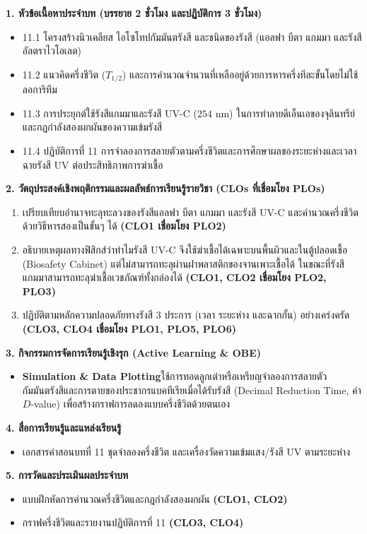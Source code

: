 \cleardoublepage
{}
\begin{planbox}
\noindent\textbf{1. หัวข้อเนื้อหาประจำบท (บรรยาย 2 ชั่วโมง และปฏิบัติการ 3 ชั่วโมง)}
\begin{itemize}
    \item 11.1 โครงสร้างนิวเคลียส ไอโซโทปกัมมันตรังสี และชนิดของรังสี (แอลฟา บีตา แกมมา และรังสีอัลตราไวโอเลต)
    \item 11.2 แนวคิดครึ่งชีวิต ($T_{1/2}$) และการคำนวณจำนวนที่เหลืออยู่ด้วยการหารครึ่งทีละขั้นโดยไม่ใช้ลอการิทึม
    \item 11.3 การประยุกต์ใช้รังสีแกมมาและรังสี UV-C ($254\text{ nm}$) ในการทำลายดีเอ็นเอของจุลินทรีย์และกฎกำลังสองผกผันของความเข้มรังสี
    \item 11.4 ปฏิบัติการที่ 11 การจำลองการสลายตัวตามครึ่งชีวิตและการศึกษาผลของระยะห่างและเวลาฉายรังสี UV ต่อประสิทธิภาพการฆ่าเชื้อ
\end{itemize}

\noindent\textbf{2. วัตถุประสงค์เชิงพฤติกรรมและผลลัพธ์การเรียนรู้รายวิชา (CLOs ที่เชื่อมโยง PLOs)}
\begin{enumerate}
    \item เปรียบเทียบอำนาจทะลุทะลวงของรังสีแอลฟา บีตา แกมมา และรังสี UV-C และคำนวณครึ่งชีวิตด้วยวิธีหารสองเป็นขั้นๆ ได้ \textbf{(CLO1 เชื่อมโยง PLO2)}
    \item อธิบายเหตุผลทางฟิสิกส์ว่าทำไมรังสี UV-C จึงใช้ฆ่าเชื้อได้เฉพาะบนพื้นผิวและในตู้ปลอดเชื้อ (Biosafety Cabinet) แต่ไม่สามารถทะลุผ่านฝาพลาสติกของจานเพาะเชื้อได้ ในขณะที่รังสีแกมมาสามารถทะลุฆ่าเชื้อเวชภัณฑ์ทั้งกล่องได้ \textbf{(CLO1, CLO2 เชื่อมโยง PLO2, PLO3)}
    \item ปฏิบัติตามหลักความปลอดภัยทางรังสี 3 ประการ (เวลา ระยะห่าง และฉากกั้น) อย่างเคร่งครัด \textbf{(CLO3, CLO4 เชื่อมโยง PLO1, PLO5, PLO6)}
\end{enumerate}

\noindent\textbf{3. กิจกรรมการจัดการเรียนรู้เชิงรุก (Active Learning \& OBE)}
\begin{itemize}
    \item \textbf{Simulation \& Data Plotting}\quad ใช้การทอดลูกเต๋าหรือเหรียญจำลองการสลายตัวกัมมันตรังสีและการตายของประชากรแบคทีเรียเมื่อได้รับรังสี (Decimal Reduction Time, ค่า $D$-value) เพื่อสร้างกราฟการลดลงแบบครึ่งชีวิตด้วยตนเอง
\end{itemize}

\noindent\textbf{4. สื่อการเรียนรู้และแหล่งเรียนรู้}
\begin{itemize}
    \item เอกสารคำสอนบทที่ 11 ชุดจำลองครึ่งชีวิต และเครื่องวัดความเข้มแสง/รังสี UV ตามระยะห่าง
\end{itemize}

\noindent\textbf{5. การวัดและประเมินผลประจำบท}
\begin{itemize}
    \item แบบฝึกหัดการคำนวณครึ่งชีวิตและกฎกำลังสองผกผัน \textbf{(CLO1, CLO2)}
    \item กราฟครึ่งชีวิตและรายงานปฏิบัติการที่ 11 \textbf{(CLO3, CLO4)}
\end{itemize}
\end{planbox}
\clearpage

